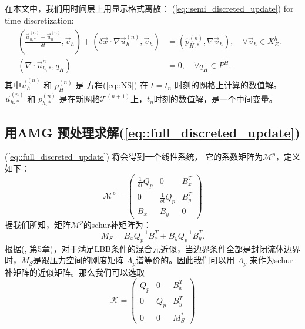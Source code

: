 \begin{enumerate}[step 1]
       在本文中，我们用时间层上用显示格式离散：
       (\ref{eq::semi_discreted_update}) for time discretization:
       \begin{eqnarray}
         \begin{aligned}
           \left ( \frac{\vec{u}_{h, *}^{(n)} - \vec{u}_h^{(n)}}{\delta
               t},
           \vec{v}_h \right) + \left( \delta \vec{x} \cdot \nabla
           \vec{u}_{h}^{(n)}, \vec{v}_h \right)  & =  \left(
           \hat{p}_{H, *}^{(n)}, \nabla \vec{v}_h \right), \quad
           \forall \vec{v}_h \in X_E^h. &\\
           \left( \nabla \cdot \vec{u}_{h, *}^{n}, q_H \right) & =  0, \quad
           \forall q_H \in P^H. &
         \end{aligned}
         \label{eq::full_discreted_update}
       \end{eqnarray}
       其中$\vec{u}_h^{(n)}$ 和 $p_H^{(n)}$ 是 方程(\ref{eq::NS}) 在 $t = t_{n}$ 时刻的网格上计算的数值解。$\vec{u}_{h,*}^{(n)}$ 和 $p_{h, *}^{(n)}$
      是在新网格$\mathcal{T}^{(n + 1)}$上，$t_n$时刻的数值解，是一个中间变量。
     \end{enumerate}

   \subsection{用AMG 预处理求解(\ref{eq::full_discreted_update})}
   (\ref{eq::full_discreted_update}) 将会得到一个线性系统， 它的系数矩阵为$\mathcal{M}^p$，定义如下：
   \begin{equation}
     \mathcal{M}^p =
     \left(
       \begin{array}{lll}
         \frac{1}{\delta t} Q_p & 0 & B_x^T \\
         0 & \frac{1}{\delta t} Q_p & B_y^T \\
         B_x & B_y & 0
       \end{array}
     \right)
     \label{mat::moving}
   \end{equation}
   据我们所知，矩阵$\mathcal{M}^p$的schur补矩阵为：
   \begin{equation}
    M_S = B_x Q_p^{-1} B_x^T + B_y Q_p^{-1} B_y^T.
   \end{equation}
   根据(\cite{elman2005finite}, 第5章)，对于满足LBB条件的混合元近似，当边界条件全部是封闭流体边界时，$M_S$是跟压力空间的刚度矩阵
   $A_p$谱等价的。因此我们可以用 $A_p$ 来作为schur补矩阵的近似矩阵。那么我们可以选取
   \begin{equation}
     \mathcal{K} =
     \left(
       \begin{array}{lll}
         Q_p & 0 & B_x^T \\
         0 & Q_p & B_y^T \\
         0 & 0 & M_S^*
       \end{array}
     \right)
     \label{eq::updateSolution_precond}
   \end{equation}

